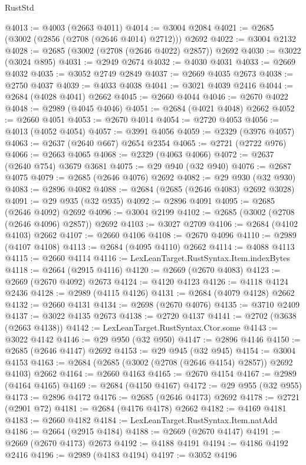 \begin{lexlean}{RustStd}
\begin{coremodule}
@4013 := @4003 (@2663 @4011)
@4014 := @3004 @2084
@4021 := @2685 (@3002 (@2856 (@2708 (@2646 @4014) @2712))) @2692
@4022 := @3004 @2132
@4028 := @2685 (@3002 (@2708 (@2646 @4022) @2857)) @2692
@4030 := @3022 (@3024 @895)
@4031 := @2949 @2674
@4032 := @4030 @4031
@4033 := @2669 @4032
@4035 := @3052 @2749 @2849
@4037 := @2669 @4035 @2673
@4038 := @2750 @4037
@4039 := @4033 @4038
@4041 := @3021 @4039 @2416
@4044 := @2684 (@4028 @4041) @2662
@4045 := @2660 @4044
@4046 := @2670 @4022
@4048 := @2989 (@4045 @4046)
@4051 := @2684 (@4021 @4048) @2662
@4052 := @2660 @4051
@4053 := @2670 @4014
@4054 := @2720 @4053
@4056 := @4013 (@4052 @4054)
@4057 := @3991 @4056
@4059 := @2329 (@3976 @4057)
@4063 := @2637 (@2640 @667) @2654 @2354
@4065 := @2721 (@2722 @976)
@4066 := @2663 @4065
@4068 := @2329 (@4063 @4066)
@4072 := @2637 (@2640 @754) @3679 @3681
@4075 := @29 @940 (@32 @940)
@4076 := @2687 @4075
@4079 := @2685 (@2646 @4076) @2692
@4082 := @29 @930 (@32 @930)
@4083 := @2896 @4082
@4088 := @2684 (@2685 (@2646 @4083) @2692 @3028)
@4091 := @29 @935 (@32 @935)
@4092 := @2896 @4091
@4095 := @2685 (@2646 @4092) @2692
@4096 := @3004 @2199
@4102 := @2685 (@3002 (@2708 (@2646 @4096) @2857)) @2692
@4103 := @3027 @2709
@4106 := @2684 (@4102 @4103) @2662
@4107 := @2660 @4106
@4108 := @2670 @4096
@4110 := @2989 (@4107 @4108)
@4113 := @2684 (@4095 @4110) @2662
@4114 := @4088 @4113
@4115 := @2660 @4114
@4116 := LexLeanTarget.RustSyntax.Item.indexBytes
@4118 := @2664 (@2915 @4116)
@4120 := @2669 (@2670 @4083)
@4123 := @2669 (@2670 @4092) @2673
@4124 := @4120 @4123
@4126 := @4118 @4124 @2436
@4128 := @2989 (@4115 @4126)
@4131 := @2684 (@4079 @4128) @2662
@4132 := @2660 @4131
@4134 := @2698 (@2670 @4076)
@4135 := @3710 @2409
@4137 := @3022 @4135 @2673
@4138 := @2720 @4137
@4141 := @2702 (@3638 (@2663 @4138))
@4142 := LexLeanTarget.RustSyntax.Ctor.some
@4143 := @3022 @4142
@4146 := @29 @950 (@32 @950)
@4147 := @2896 @4146
@4150 := @2685 (@2646 @4147) @2692
@4153 := @29 @945 (@32 @945)
@4154 := @3004 @4153
@4163 := @2684 (@2685 (@3002 (@2708 (@2646 @4154) @2857)) @2692 @4103) @2662
@4164 := @2660 @4163
@4165 := @2670 @4154
@4167 := @2989 (@4164 @4165)
@4169 := @2684 (@4150 @4167)
@4172 := @29 @955 (@32 @955)
@4173 := @2896 @4172
@4176 := @2685 (@2646 @4173) @2692
@4178 := @2721 (@2901 @72)
@4181 := @2684 (@4176 @4178) @2662
@4182 := @4169 @4181
@4183 := @2660 @4182
@4184 := LexLeanTarget.RustSyntax.Item.natAdd
@4186 := @2664 (@2915 @4184)
@4188 := @2669 (@2670 @4147)
@4191 := @2669 (@2670 @4173) @2673
@4192 := @4188 @4191
@4194 := @4186 @4192 @2416
@4196 := @2989 (@4183 @4194)
@4197 := @3052 @4196

\end{coremodule}
\end{lexlean}
